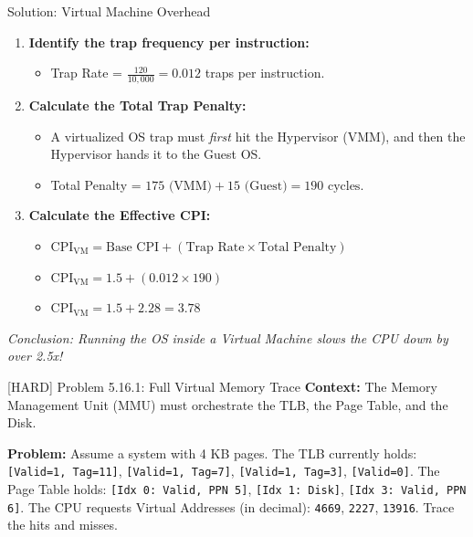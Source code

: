 \documentclass[aspectratio=169]{beamer}
\begin{document}
\begin{frame}{Solution: Virtual Machine Overhead}
\begin{enumerate}
    \item \textbf{Identify the trap frequency per instruction:}
    \begin{itemize}
        \item Trap Rate = $\frac{120}{10,000} = 0.012$ traps per instruction.
    \end{itemize}
    \item \textbf{Calculate the Total Trap Penalty:}
    \begin{itemize}
        \item A virtualized OS trap must \textit{first} hit the Hypervisor (VMM), and then the Hypervisor hands it to the Guest OS.
        \item Total Penalty = $175 \text{ (VMM)} + 15 \text{ (Guest)} = 190 \text{ cycles}$.
    \end{itemize}
    \item \textbf{Calculate the Effective CPI:}
    \begin{itemize}
        \item $\text{CPI}_{\text{VM}} = \text{Base CPI} + (\text{Trap Rate} \times \text{Total Penalty})$
        \item $\text{CPI}_{\text{VM}} = 1.5 + (0.012 \times 190)$
        \item $\text{CPI}_{\text{VM}} = 1.5 + 2.28 = \mathbf{3.78}$
    \end{itemize}
\end{enumerate}
\textit{Conclusion: Running the OS inside a Virtual Machine slows the CPU down by over 2.5x!}
\end{frame}

\begin{frame}{[HARD] Problem 5.16.1: Full Virtual Memory Trace}
\textbf{Context:} The Memory Management Unit (MMU) must orchestrate the TLB, the Page Table, and the Disk.
\vspace{0.5cm}

\textbf{Problem:}
Assume a system with 4 KB pages. The TLB currently holds: \texttt{[Valid=1, Tag=11]}, \texttt{[Valid=1, Tag=7]}, \texttt{[Valid=1, Tag=3]}, \texttt{[Valid=0]}. The Page Table holds: \texttt{[Idx 0: Valid, PPN 5]}, \texttt{[Idx 1: Disk]}, \texttt{[Idx 3: Valid, PPN 6]}. The CPU requests Virtual Addresses (in decimal): \texttt{4669}, \texttt{2227}, \texttt{13916}. Trace the hits and misses.
\end{frame}
\end{document}
